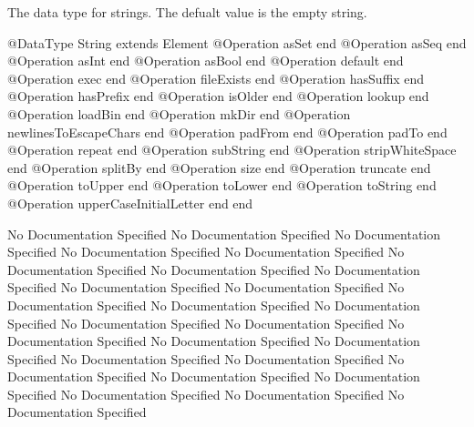       The data type for strings. The defualt value is the empty string.
\begin{Interface}
@DataType String extends Element
  @Operation asSet end
  @Operation asSeq end
  @Operation asInt end
  @Operation asBool end
  @Operation default end
  @Operation exec end
  @Operation fileExists end
  @Operation hasSuffix end
  @Operation hasPrefix end
  @Operation isOlder end
  @Operation lookup end
  @Operation loadBin end
  @Operation mkDir end
  @Operation newlinesToEscapeChars end
  @Operation padFrom end
  @Operation padTo end
  @Operation repeat end
  @Operation subString end
  @Operation stripWhiteSpace end
  @Operation splitBy end
  @Operation size end
  @Operation truncate end
  @Operation toUpper end
  @Operation toLower end
  @Operation toString end
  @Operation upperCaseInitialLetter end
end
\end{Interface}
No Documentation Specified
No Documentation Specified
No Documentation Specified
No Documentation Specified
No Documentation Specified
No Documentation Specified
No Documentation Specified
No Documentation Specified
No Documentation Specified
No Documentation Specified
No Documentation Specified
No Documentation Specified
No Documentation Specified
No Documentation Specified
No Documentation Specified
No Documentation Specified
No Documentation Specified
No Documentation Specified
No Documentation Specified
No Documentation Specified
No Documentation Specified
No Documentation Specified
No Documentation Specified
No Documentation Specified
No Documentation Specified
No Documentation Specified

